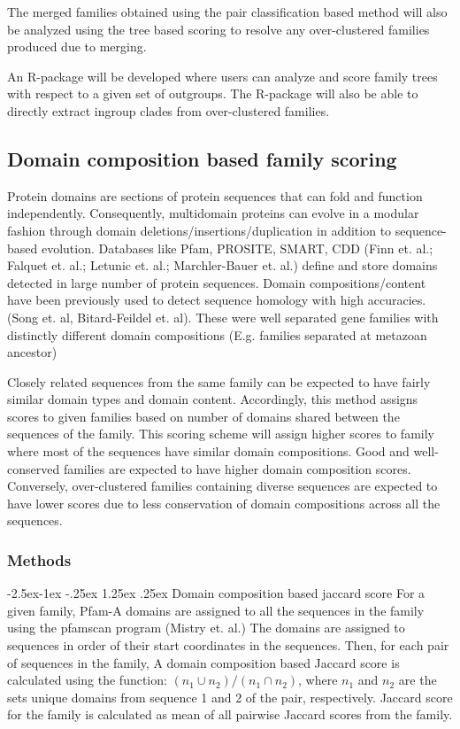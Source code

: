 \documentclass{article}
\makeatletter
\renewcommand\paragraph{\@startsection{paragraph}{4}{\z@}%
	{-2.5ex\@plus -1ex \@minus -.25ex}%
	{1.25ex \@plus .25ex}%
	{\normalfont\normalsize\bfseries}}
\makeatother
\begin{document}
		The merged families obtained using the pair classification based method will also be analyzed using the tree based scoring to resolve any over-clustered families produced due to merging.
		
		An R-package will be developed where users can analyze and score family trees with respect to a given set of outgroups. The R-package will also be able to directly extract ingroup clades from over-clustered families.
		\pagebreak
		
	\subsection{Domain composition based family scoring}
	Protein domains are sections of protein sequences that can fold and function independently. Consequently, multidomain proteins can evolve in a modular fashion through domain deletions/insertions/duplication in addition to sequence-based evolution. Databases like Pfam, PROSITE, SMART, CDD (Finn et. al.; Falquet et. al.; Letunic et. al.; Marchler-Bauer et. al.) define and store domains detected in large number of protein sequences. Domain compositions/content have been previously used to detect sequence homology with high accuracies. (Song et. al, Bitard-Feildel et. al). These were well separated gene families with distinctly different domain compositions (E.g. families separated at metazoan ancestor)
	
	Closely related sequences from the same family can be expected to have fairly similar domain types and domain content. Accordingly, this method assigns scores to given families based on number of domains shared between the sequences of the family. This scoring scheme will assign higher scores to family where most of the sequences have similar domain compositions. Good and well-conserved families are expected to have higher domain composition scores. Conversely, over-clustered families containing diverse sequences are expected to have lower scores due to less conservation of domain compositions across all the sequences.
	
	\subsubsection{Methods}
		\paragraph{Domain composition based jaccard score}
		For a given family, Pfam-A domains are assigned to all the sequences in the family using the pfamscan program (Mistry et. al.) The domains are assigned  to sequences in order of their start coordinates in the sequences. Then, for each pair of sequences in the family, A domain composition based Jaccard score is calculated using the function: $(n_1 \cup  n_2)/(n_1 \cap n_2)$, where $n_1$ and $n_2$ are the sets unique domains from sequence 1 and 2 of the pair, respectively. Jaccard score for the family is calculated as mean of all pairwise Jaccard scores from the family.
		
\end{document}
